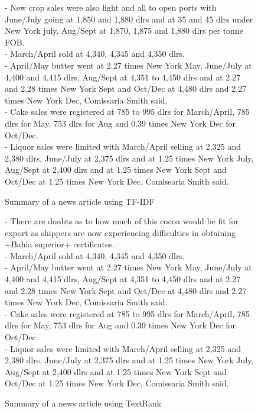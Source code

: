 \documentclass{article}[10]
\begin{document}
\begin{figure}
    \begin{framed}
        - New crop sales were also light and all to open ports with  June/July going at 1,850 and 1,880 dlrs and at 35 and 45 dlrs  under New York july, Aug/Sept at 1,870, 1,875 and 1,880 dlrs  per tonne FOB.\\
        - March/April sold at  4,340, 4,345 and 4,350 dlrs.\\
        - April/May butter went at 2.27 times New York May, June/July  at 4,400 and 4,415 dlrs, Aug/Sept at 4,351 to 4,450 dlrs and at  2.27 and 2.28 times New York Sept and Oct/Dec at 4,480 dlrs and  2.27 times New York Dec, Comissaria Smith said.\\
        - Cake sales were registered at 785 to 995 dlrs for  March/April, 785 dlrs for May, 753 dlrs for Aug and 0.39 times  New York Dec for Oct/Dec.\\
        - Liquor sales were limited with March/April selling at 2,325  and 2,380 dlrs, June/July at 2,375 dlrs and at 1.25 times New  York July, Aug/Sept at 2,400 dlrs and at 1.25 times New York  Sept and Oct/Dec at 1.25 times New York Dec, Comissaria Smith  said.
        \caption{Summary of a news article using TF-IDF}
        \label{results-tfidf-cnn}
    \end{framed}
\end{figure}
\begin{figure}
    \begin{framed}
        - There are doubts as to how much of this cocoa would be fit  for export as shippers are now experiencing difficulties in  obtaining +Bahia superior+ certificates.\\
        - March/April sold at  4,340, 4,345 and 4,350 dlrs.\\
        - April/May butter went at 2.27 times New York May, June/July  at 4,400 and 4,415 dlrs, Aug/Sept at 4,351 to 4,450 dlrs and at  2.27 and 2.28 times New York Sept and Oct/Dec at 4,480 dlrs and  2.27 times New York Dec, Comissaria Smith said.\\
        - Cake sales were registered at 785 to 995 dlrs for  March/April, 785 dlrs for May, 753 dlrs for Aug and 0.39 times  New York Dec for Oct/Dec.\\
        - Liquor sales were limited with March/April selling at 2,325  and 2,380 dlrs, June/July at 2,375 dlrs and at 1.25 times New  York July, Aug/Sept at 2,400 dlrs and at 1.25 times New York  Sept and Oct/Dec at 1.25 times New York Dec, Comissaria Smith  said.

        \caption{Summary of a news article using TextRank}
        \label{results-textrank-cnn}
    \end{framed}
\end{figure}
\end{document}
